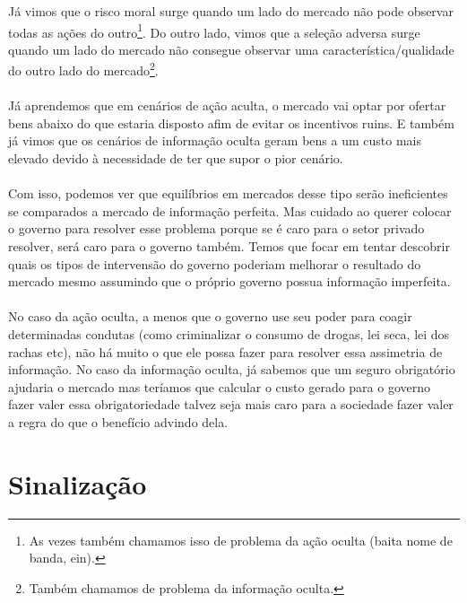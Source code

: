 \documentclass[a4paper,11pt,oneside]{book}
\theoremstyle{definition}
\theoremstyle{break}
\begin{document}
Já vimos que o risco moral surge quando um lado do mercado não pode observar todas as ações do outro\footnote{As vezes também chamamos isso de problema da ação oculta (baita nome de banda, ein).}. Do outro lado, vimos que a seleção adversa surge quando um lado do mercado não consegue observar uma característica/qualidade do outro lado do mercado\footnote{Também chamamos de problema da informação oculta.}.
\\~\\
Já aprendemos que em cenários de ação aculta, o mercado vai optar por ofertar bens abaixo do que estaria disposto afim de evitar os incentivos ruins. E também já vimos que os cenários de informação oculta geram bens a um custo mais elevado devido à necessidade de ter que supor o pior cenário.
\\~\\
Com isso, podemos ver que equilíbrios em mercados desse tipo serão ineficientes se comparados a mercado de informação perfeita. Mas cuidado ao querer colocar o governo para resolver esse problema porque se é caro para o setor privado resolver, será caro para o governo também. Temos que focar em tentar descobrir quais os tipos de intervensão do governo poderiam melhorar o resultado do mercado mesmo assumindo que o próprio governo possua informação imperfeita.
\\~\\
No caso da ação oculta, a menos que o governo use seu poder para coagir determinadas condutas (como criminalizar o consumo de drogas, lei seca, lei dos rachas etc), não há muito o que ele possa fazer para resolver essa assimetria de informação. No caso da informação oculta, já sabemos que um seguro obrigatório ajudaria o mercado mas teríamos que calcular o custo gerado para o governo fazer valer essa obrigatoriedade talvez seja mais caro para a sociedade fazer valer a regra do que o benefício advindo dela.

\section{Sinalização}
\end{document}
